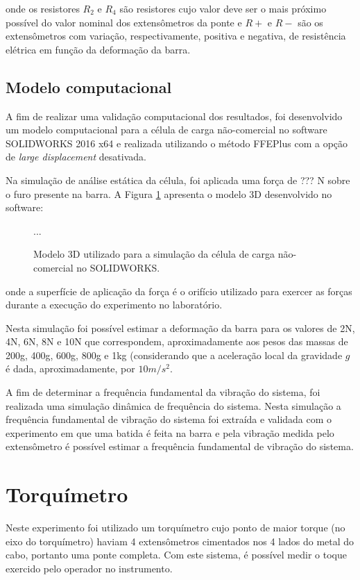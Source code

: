 \documentclass[a4paper]{instrumentacao}
\begin{document}
\noindent onde os resistores $R_2$ e $R_4$ são resistores cujo valor deve ser o mais próximo possível do valor nominal dos extensômetros da ponte e $R+$ e $R-$ são os extensômetros com variação, respectivamente, positiva e negativa, de resistência elétrica em função da deformação da barra.

\subsection{Modelo computacional}
A fim de realizar uma validação computacional dos resultados, foi desenvolvido um modelo computacional para a célula de carga não-comercial no software SOLIDWORKS 2016 x64 e realizada utilizando o método FFEPlus com a opção de \textit{large displacement} desativada.

Na simulação de análise estática da célula, foi aplicada uma força de ??? N  sobre o furo presente na barra. A Figura \ref{fig:celula-nao-comercial-solid-modelo} apresenta o modelo 3D desenvolvido no software:

\begin{figure}[H]
\center
...
\caption{Modelo 3D utilizado para a simulação da célula de carga não-comercial no SOLIDWORKS.}
\label{fig:celula-nao-comercial-solid-modelo}
\end{figure}

\noindent onde a superfície de aplicação da força é o orifício utilizado para exercer as forças durante a execução do experimento no laboratório.

Nesta simulação foi possível estimar a deformação da barra para os valores de 2N, 4N, 6N, 8N e 10N que correspondem, aproximadamente aos pesos das massas de 200g, 400g, 600g, 800g e 1kg (considerando que a aceleração local da gravidade $g$ é dada, aproximadamente, por $10 m/s^2$.

A fim de determinar a frequência fundamental da vibração do sistema, foi realizada uma simulação dinâmica de frequência do sistema. Nesta simulação a frequência fundamental de vibração do sistema foi extraída e validada com o experimento em que uma batida é feita na barra e pela vibração medida pelo extensômetro é possível estimar a frequência fundamental de vibração do sistema.

\section{Torquímetro}
Neste experimento foi utilizado um torquímetro cujo ponto de maior torque (no eixo do torquímetro) haviam 4 extensômetros cimentados nos 4 lados do metal do cabo, portanto uma ponte completa. Com este sistema, é possível medir o toque exercido pelo operador no instrumento.
\end{document}
